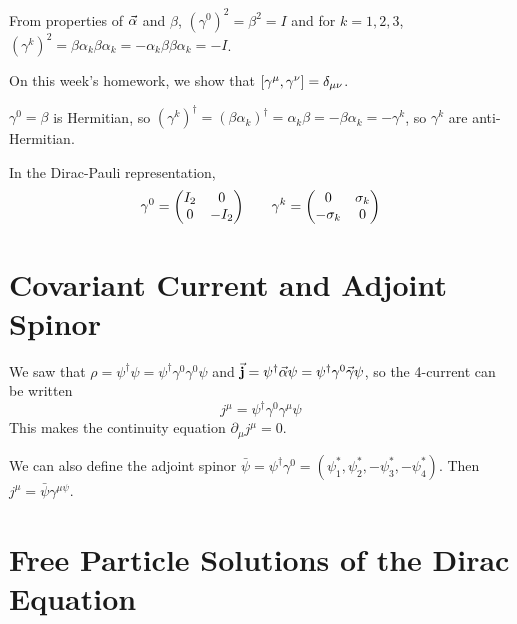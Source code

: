 \documentclass[a4paper,twoside,master.tex]{subfiles}
\begin{document}
From properties of $ \va{\alpha} $ and $\beta$, $ (\gamma^0)^2 = \beta^2 = I $ and for $ k = 1,2,3 $, $ (\gamma^k)^2 = \beta \alpha_k \beta \alpha_k = - \alpha_k \beta \beta \alpha_k = - I $.

On this week's homework, we show that $ \comm{\gamma^{\mu}}{\gamma^{\nu}} = \delta_{\mu \nu} $. 

$ \gamma^0 = \beta $ is Hermitian, so $ (\gamma^{k})^\dagger = (\beta \alpha_k)^\dagger = \alpha_k \beta = - \beta \alpha_k = - \gamma^k  $, so $ \gamma^k $ are anti-Hermitian.

In the Dirac-Pauli representation,
\begin{equation}
    \gamma^0 = \mqty(I_2 & 0 \\ 0 & -I_2) \qquad \gamma^k = \mqty(0 & \sigma_k \\ - \sigma_k & 0)
\end{equation}

\section{Covariant Current and Adjoint Spinor}\label{sec:covariant_current_and_adjoint_spinor}

We saw that $ \rho = \psi^\dagger \psi = \psi^\dagger \gamma^0 \gamma^0 \psi $ and $ \va{j} = \psi^\dagger \va{\alpha} \psi = \psi^\dagger \gamma^0 \va{\gamma} \psi $, so the 4-current can be written
\begin{equation}
    j^{\mu} = \psi^\dagger \gamma^0 \gamma^{\mu} \psi
\end{equation}
This makes the continuity equation $ \partial_{\mu} j^{\mu} = 0 $.

We can also define the adjoint spinor $ \bar{\psi} = \psi^\dagger \gamma^0 = (\psi_1^*, \psi_2^*, - \psi_3^*, - \psi_4^*) $. Then $ j^{\mu} = \bar{\psi} \gamma^{\mu \psi} $.

\section{Free Particle Solutions of the Dirac Equation}\label{sec:free_particle_solutions_of_the_dirac_equation}
\end{document}
